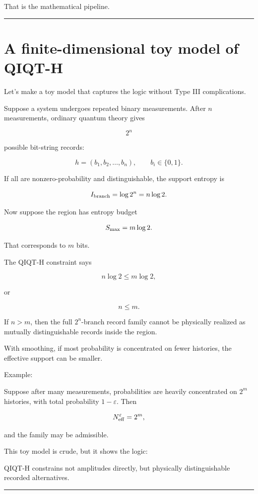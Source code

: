 \documentclass[11pt,a4paper]{article}
\newenvironment{qiqtquote}{\begin{mdframed}[style=quotestyle]}{\end{mdframed}}
\begin{document}
That is the mathematical pipeline.

\medskip\hrule\medskip

\section{A finite-dimensional toy model of QIQT-H}

Let’s make a toy model that captures the logic without Type III complications.

Suppose a system undergoes repeated binary measurements. After $n$ measurements, ordinary quantum theory gives

\[
2^n
\]

possible bit-string records:

\[
h=(b_1,b_2,\dots,b_n),
\qquad b_i\in\{0,1\}.
\]

If all are nonzero-probability and distinguishable, the support entropy is

\[
I_{\rm branch}= \log 2^n = n\log 2.
\]

Now suppose the region has entropy budget

\[
S_{\rm max}=m\log 2.
\]

That corresponds to $m$ bits.

The QIQT-H constraint says

\[
n\log 2 \leq m\log 2,
\]

or

\[
n\leq m.
\]

If $n>m$, then the full $2^n$-branch record family cannot be physically realized as mutually distinguishable records inside the region.

With smoothing, if most probability is concentrated on fewer histories, the effective support can be smaller.

Example:

Suppose after many measurements, probabilities are heavily concentrated on $2^m$ histories, with total probability $1-\varepsilon$. Then

\[
N^\varepsilon_{\rm eff}=2^m,
\]

and the family may be admissible.

This toy model is crude, but it shows the logic:

\begin{qiqtquote}
QIQT-H constrains not amplitudes directly, but physically distinguishable recorded alternatives.
\end{qiqtquote}

\medskip\hrule\medskip
\end{document}

